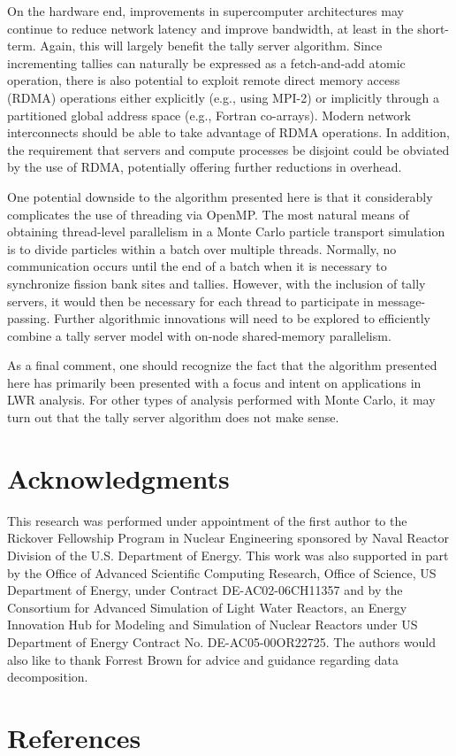 \documentclass[3p]{elsarticle}
\begin{document}
On the hardware end, improvements in supercomputer architectures may continue to
reduce network latency and improve bandwidth, at least in the short-term. Again,
this will largely benefit the tally server algorithm. Since incrementing tallies
can naturally be expressed as a fetch-and-add atomic operation, there is also
potential to exploit remote direct memory access (RDMA) operations either
explicitly (e.g., using MPI-2) or implicitly through a partitioned global
address space (e.g., Fortran co-arrays). Modern network interconnects should be
able to take advantage of RDMA operations. In addition, the requirement that
servers and compute processes be disjoint could be obviated by the use of RDMA,
potentially offering further reductions in overhead.

One potential downside to the algorithm presented here is that it considerably
complicates the use of threading via OpenMP. The most natural means of obtaining
thread-level parallelism in a Monte Carlo particle transport simulation is to
divide particles within a batch over multiple threads. Normally, no
communication occurs until the end of a batch when it is necessary to
synchronize fission bank sites and tallies. However, with the inclusion of tally
servers, it would then be necessary for each thread to participate in
message-passing. Further algorithmic innovations will need to be explored to
efficiently combine a tally server model with on-node shared-memory parallelism.

As a final comment, one should recognize the fact that the algorithm presented
here has primarily been presented with a focus and intent on applications in LWR
analysis. For other types of analysis performed with Monte Carlo, it may turn
out that the tally server algorithm does not make sense.

\section*{Acknowledgments}

This research was performed under appointment of the first author to the
Rickover Fellowship Program in Nuclear Engineering sponsored by Naval Reactor
Division of the U.S. Department of Energy. This work was also supported in part
by the Office of Advanced Scientific Computing Research, Office of Science, US
Department of Energy, under Contract DE-AC02-06CH11357 and by the Consortium for
Advanced Simulation of Light Water Reactors, an Energy Innovation Hub for
Modeling and Simulation of Nuclear Reactors under US Department of Energy
Contract No. DE-AC05-00OR22725. The authors would also like to thank Forrest
Brown for advice and guidance regarding data decomposition.

\section*{References}



\end{document}
